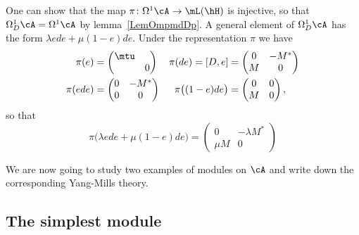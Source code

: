 One can show that the map $\pi\colon \Omega^1\cA\to \mL(\hH)$ is injective, so that $\Omega^1_D\cA=\Omega^1\cA$ by lemma~\ref{LemOmpmdDp}. A general element of $\Omega^1_D\cA$ has the form $\lambda ede+\mu(1-e)de$. Under the representation $\pi$ we have
\begin{align*}
	\pi(e)                 & =\begin{pmatrix}
		                          \mtu \\&0
	                          \end{pmatrix} &
	\pi(de)=[D,e]          & =\begin{pmatrix}
		                          0 & -M^* \\
		                          M & 0
	                          \end{pmatrix}  \\
	\pi(ede)               & =\begin{pmatrix}
		                          0 & -M^* \\
		                          0 & 0
	                          \end{pmatrix} &
	\pi\big( (1-e)de \big) & =
	\begin{pmatrix}
		0 & 0 \\M&0
	\end{pmatrix},
\end{align*}
so that
\begin{equation}		\label{EqElOmAD}
	\pi\big( \lambda e de+\mu(1-e)de \big)=\begin{pmatrix}
		0     & -\lambda M^* \\
		\mu M & 0
	\end{pmatrix}
\end{equation}



We are now going to study two examples of modules on $\cA$ and write down the corresponding Yang-Mills theory.

\subsection{The simplest module}

